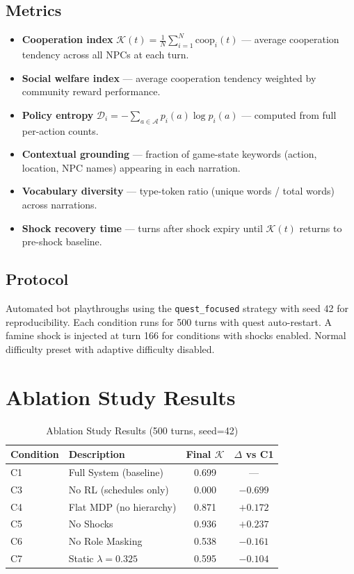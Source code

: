\documentclass[12pt, a4paper, oneside]{report}
\begin{document}
\subsection{Metrics}

\begin{itemize}[nosep]
    \item \textbf{Cooperation index} $\mathcal{K}(t) = \frac{1}{N} \sum_{i=1}^{N} \text{coop}_i(t)$ --- average cooperation tendency across all NPCs at each turn.
    \item \textbf{Social welfare index} --- average cooperation tendency weighted by community reward performance.
    \item \textbf{Policy entropy} $\mathcal{D}_i = -\sum_{a \in \mathcal{A}} p_i(a) \log p_i(a)$ --- computed from full per-action counts.
    \item \textbf{Contextual grounding} --- fraction of game-state keywords (action, location, NPC names) appearing in each narration.
    \item \textbf{Vocabulary diversity} --- type-token ratio (unique words / total words) across narrations.
    \item \textbf{Shock recovery time} --- turns after shock expiry until $\mathcal{K}(t)$ returns to pre-shock baseline.
\end{itemize}

\subsection{Protocol}

Automated bot playthroughs using the \texttt{quest\_focused} strategy with seed 42 for reproducibility. Each condition runs for 500 turns with quest auto-restart. A famine shock is injected at turn 166 for conditions with shocks enabled. Normal difficulty preset with adaptive difficulty disabled.

\section{Ablation Study Results}
\label{sec:ablation-results}

\begin{table}[H]
\centering
\caption{Ablation Study Results (500 turns, seed=42)}
\label{tab:results}
\begin{tabular}{llcc}
\toprule
\textbf{Condition} & \textbf{Description} & \textbf{Final $\mathcal{K}$} & \textbf{$\Delta$ vs C1} \\
\midrule
C1 & Full System (baseline) & 0.699 & --- \\
C3 & No RL (schedules only) & 0.000 & $-0.699$ \\
C4 & Flat MDP (no hierarchy) & 0.871 & $+0.172$ \\
C5 & No Shocks & 0.936 & $+0.237$ \\
C6 & No Role Masking & 0.538 & $-0.161$ \\
C7 & Static $\lambda = 0.325$ & 0.595 & $-0.104$ \\
\bottomrule
\end{tabular}
\end{table}
\end{document}
